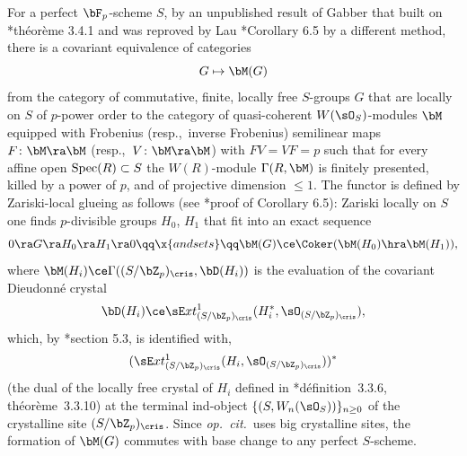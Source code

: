 

 \label{Gab-eq}
For a perfect $\bF_p$-scheme $S$, by an unpublished result of Gabber that built on \cite{Ber80}*{th\'{e}or\`{e}me 3.4.1} and was reproved by Lau \cite{Lau13}*{Corollary 6.5} by a different method, there is a covariant equivalence of categories
\[
G \mapsto \bM(G)
\]
from the category of commutative, finite, locally free $S$-groups $G$ that are locally on $S$ of $p$-power order to the category of quasi-coherent %
$W(\sO_S)$-modules $\bM$ equipped with Frobenius (resp.,~inverse Frobenius) semilinear maps $F\colon \bM \ra \bM$ (resp.,~$V\colon \bM \ra \bM$) with $FV = VF = p$ such that for every  affine open $\operatorname{Spec}(R) \subset S$ the $W(R)$-module $\Gamma(R, \bM)$ is finitely presented, killed by a power of $p$, and of projective dimension $\le 1$. The functor is defined by Zariski-local glueing as follows (see \cite{Lau13}*{proof of Corollary 6.5}): Zariski locally on $S$ one finds $p$-divisible groups $H_0$, $H_1$ that fit into an exact sequence
\[
0 \ra G \ra H_0 \ra H_1 \ra 0 \qq \x{and sets} \qq \bM(G) \ce \Coker(\bM(H_0) \hra \bM(H_1)),
\]
where $\bM(H_i) \ce \Gamma((S/\bZ_p)_\cris, \bD(H_i))$ is the evaluation of the covariant Dieudonn\'{e} crystal
\[
\bD(H_i) \ce \sE xt^1_{(S/\bZ_p)_\cris}(H_i^*, \sO_{(S/\bZ_p)_\cris}),
\]
which, by \cite{BBM82}*{section 5.3}, is identified with,
 \[
(\sE xt^1_{(S/\bZ_p)_\cris}(H_i, \sO_{(S/\bZ_p)_\cris}))^*
\]
(the dual of the locally free crystal of $H_i$ defined in \cite{BBM82}*{d\'{e}finition~3.3.6, th\'{e}or\`{e}me~3.3.10}) at the terminal ind-object $\{(S, W_n(\sO_S))\}_{n \ge 0}$ of the crystalline site $(S/\bZ_p)_\cris$. %
Since \emph{op.~cit.}~uses big crystalline sites, the formation of $\bM(G)$ commutes with base change to any perfect $S$-scheme.
\epp



